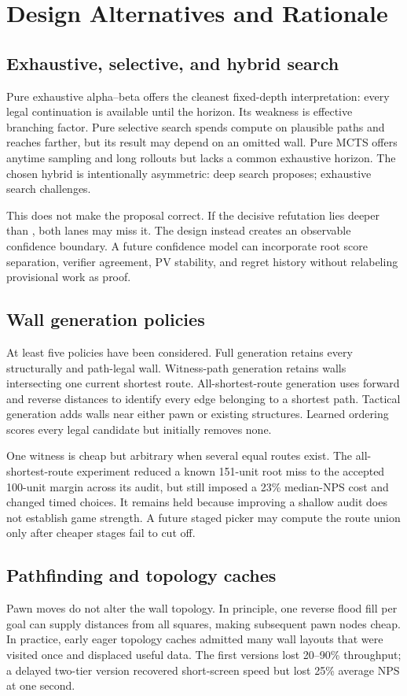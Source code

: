 \section{Design Alternatives and Rationale}
\subsection{Exhaustive, selective, and hybrid search}
Pure exhaustive alpha--beta offers the cleanest fixed-depth interpretation: every legal continuation is available until the horizon. Its weakness is effective branching factor. Pure selective search spends compute on plausible paths and reaches farther, but its result may depend on an omitted wall. Pure MCTS offers anytime sampling and long rollouts but lacks a common exhaustive horizon. The chosen hybrid is intentionally asymmetric: deep search proposes; exhaustive search challenges.

This does not make the proposal correct. If the decisive refutation lies deeper than \verifiedDepth, both lanes may miss it. The design instead creates an observable confidence boundary. A future confidence model can incorporate root score separation, verifier agreement, PV stability, and regret history without relabeling provisional work as proof.

\subsection{Wall generation policies}
At least five policies have been considered. Full generation retains every structurally and path-legal wall. Witness-path generation retains walls intersecting one current shortest route. All-shortest-route generation uses forward and reverse distances to identify every edge belonging to a shortest path. Tactical generation adds walls near either pawn or existing structures. Learned ordering scores every legal candidate but initially removes none.

One witness is cheap but arbitrary when several equal routes exist. The all-shortest-route experiment reduced a known 151-unit root miss to the accepted 100-unit margin across its audit, but still imposed a 23\% median-NPS cost and changed timed choices. It remains held because improving a shallow audit does not establish game strength. A future staged picker may compute the route union only after cheaper stages fail to cut off.

\subsection{Pathfinding and topology caches}
Pawn moves do not alter the wall topology. In principle, one reverse flood fill per goal can supply distances from all squares, making subsequent pawn nodes cheap. In practice, early eager topology caches admitted many wall layouts that were visited once and displaced useful data. The first versions lost 20--90\% throughput; a delayed two-tier version recovered short-screen speed but lost 25\% average NPS at one second.

